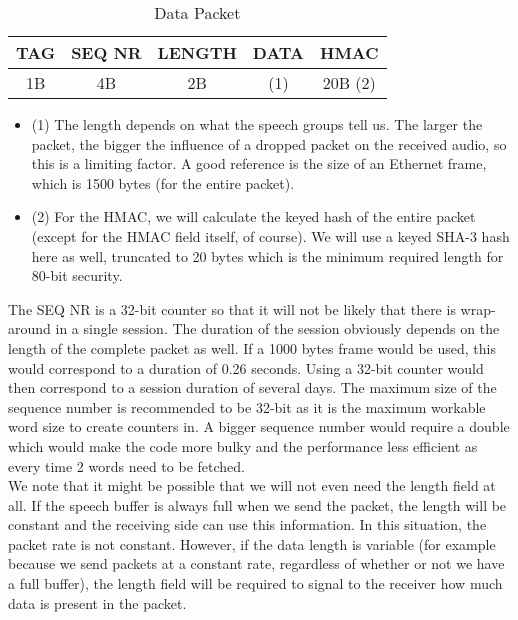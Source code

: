 \documentclass[a4paper]{article}
\begin{document}
\begin{table}[h]
    \begin{center}
        \begin{tabular}{| c | c | c | c | c |}
            \hline
            TAG & SEQ NR & LENGTH & DATA & HMAC \\ \hline
            1B & 4B & 2B & (1) & 20B (2) \\
            \hline
        \end{tabular}
    \end{center}
    
    \caption{Data Packet}
\end{table}

\begin{itemize}
  \item (1) The length depends on what the speech groups tell us. The larger the packet, the bigger the influence of a dropped packet on the received audio, so this is a limiting factor. A good reference is the size of an Ethernet frame, which is 1500 bytes (for the entire packet).
  \item (2) For the HMAC, we will calculate the keyed hash of the entire packet (except for the HMAC field itself, of course). We will use a keyed SHA-3 hash here as well, truncated to 20 bytes which is the minimum required length for 80-bit security.
\end{itemize}

The SEQ NR is a 32-bit counter so that it will not be likely that there is wrap-around in a single session. The duration of the session obviously depends on the length of the complete packet as well. If a 1000 bytes frame would be used, this would correspond to a duration of 0.26 seconds. Using a 32-bit counter would then correspond to a session duration of several days. The maximum size of the sequence number is recommended to be 32-bit as it is the maximum workable word size to create counters in. A bigger sequence number would require a double which would make the code more bulky and the performance less efficient as every time 2 words need to be fetched.\\

We note that it might be possible that we will not even need the length field at all. If the speech buffer is always full when we send the packet, the length will be constant and the receiving side can use this information. In this situation, the packet rate is not constant. However, if the data length is variable (for example because we send packets at a constant rate, regardless of whether or not we have a full buffer), the length field will be required to signal to the receiver how much data is present in the packet.
\end{document}
